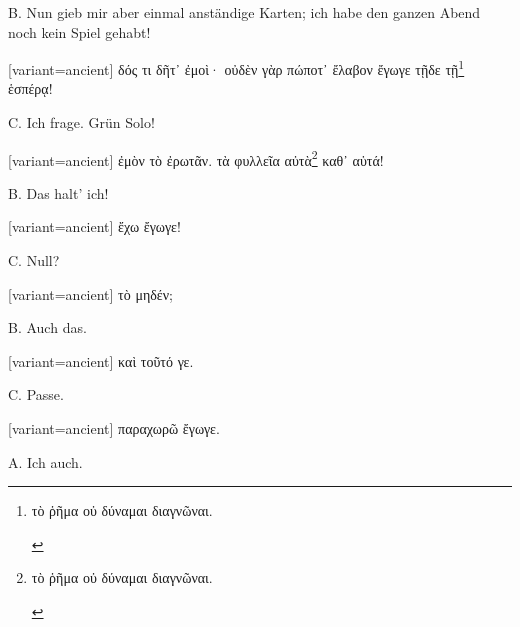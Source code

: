 B. Nun gieb mir aber einmal anständige Karten; ich habe den ganzen
Abend noch kein Spiel gehabt!

\switchcolumn

\begin{greek}[variant=ancient]%
δός τι δῆτ᾽ ἐμοὶ· οὐδὲν γὰρ πώποτ᾽ ἔλαβον ἔγωγε τῇδε τῇ\footnote{\begin{latin}%
\textgreek[variant=ancient]{τὸ ῥῆμα οὐ δύναμαι διαγνῶναι.}\end{latin}%
} ἑσπέρᾳ!

\end{greek}%
\switchcolumn*

C. Ich frage. Grün Solo!

\switchcolumn

\begin{greek}[variant=ancient]%
ἐμὸν τὸ ἐρωτᾶν. τὰ φυλλεῖα αὐτὰ\footnote{\begin{latin}%
\textgreek[variant=ancient]{τὸ ῥῆμα οὐ δύναμαι διαγνῶναι.}\end{latin}%
} καθ᾽ αὑτά!

\end{greek}%
\switchcolumn*

B. Das halt' ich!

\switchcolumn

\begin{greek}[variant=ancient]%
ἔχω ἔγωγε!

\end{greek}%
\switchcolumn*

C. Null?

\switchcolumn

\begin{greek}[variant=ancient]%
τὸ μηδέν;

\end{greek}%
\switchcolumn*

B. Auch das.

\switchcolumn

\begin{greek}[variant=ancient]%
καὶ τοῦτό γε.

\end{greek}%
\switchcolumn*

C. Passe.

\switchcolumn

\begin{greek}[variant=ancient]%
παραχωρῶ ἔγωγε.

\end{greek}%
\switchcolumn*

A. Ich auch.

